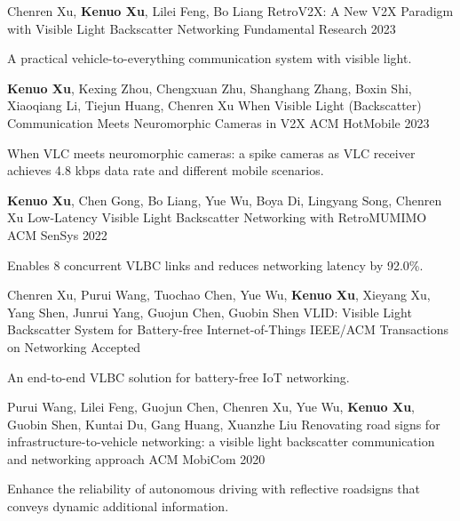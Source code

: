 \documentclass[11pt, a4paper]{awesome-cv}
\begin{document}
\begin{cventries}
	
	\cventry
	{Chenren Xu, \textbf{Kenuo Xu}, Lilei Feng, Bo Liang}
	{RetroV2X: A New V2X Paradigm with Visible Light Backscatter Networking}
	{Fundamental Research}
	{2023}
	{
		\begin{cvitems} %
			\item {A practical vehicle-to-everything communication system with visible light.}
		\end{cvitems}
	}
	
	\cventry
	{\textbf{Kenuo Xu}, Kexing Zhou, Chengxuan Zhu, Shanghang Zhang, Boxin Shi, Xiaoqiang Li, Tiejun Huang, Chenren Xu}
	{When Visible Light (Backscatter) Communication Meets Neuromorphic Cameras in V2X}
	{ACM HotMobile}
	{2023}
	{
		\begin{cvitems} %
			\item {When VLC meets neuromorphic cameras: a spike cameras as VLC receiver achieves 4.8 kbps data rate and different mobile scenarios.}
		\end{cvitems}
	}

	\cventry
	{\textbf{Kenuo Xu}, Chen Gong, Bo Liang, Yue Wu, Boya Di, Lingyang Song, Chenren Xu}
	{Low-Latency Visible Light Backscatter Networking with RetroMUMIMO}
	{ACM SenSys}
	{2022}
	{
		\begin{cvitems} %
			\item {Enables 8 concurrent VLBC links and reduces networking latency by 92.0\%.}
		\end{cvitems}
	}

	\cventry
	{Chenren Xu, Purui Wang, Tuochao Chen, Yue Wu, \textbf{Kenuo Xu}, Xieyang Xu, Yang Shen, Junrui Yang, Guojun Chen, Guobin Shen}
	{VLID: Visible Light Backscatter System for Battery-free Internet-of-Things}
	{IEEE/ACM Transactions on Networking}
	{Accepted}
	{
		\begin{cvitems} %
			\item {An end-to-end VLBC solution for battery-free IoT networking.}
		\end{cvitems}
	}
	
	\cventry
	{Purui Wang, Lilei Feng, Guojun Chen, Chenren Xu, Yue Wu, \textbf{Kenuo Xu}, Guobin Shen, Kuntai Du, Gang Huang, Xuanzhe Liu}
	{Renovating road signs for infrastructure-to-vehicle networking: a visible light backscatter communication and networking approach}
	{ACM MobiCom}
	{2020}
	{
		\begin{cvitems} %
			\item {Enhance the reliability of autonomous driving with reflective roadsigns that conveys dynamic additional information.}
		\end{cvitems}
	}
	

\end{cventries}
\end{document}
